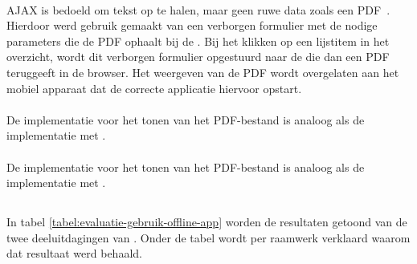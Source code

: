 \paragraph{\kendo}
AJAX is bedoeld om tekst op te halen, maar geen ruwe data zoals een PDF~\cite{Scott2009}. 
Hierdoor werd gebruik gemaakt van een verborgen formulier met de nodige parameters die de PDF ophaalt bij de . 
Bij het klikken op een lijstitem in het overzicht, wordt dit verborgen formulier opgestuurd naar de  die dan een PDF teruggeeft in de browser. 
Het weergeven van de PDF wordt overgelaten aan het mobiel apparaat dat de correcte applicatie hiervoor opstart.

\paragraph{\jqm}
De implementatie voor het tonen van het PDF-bestand is analoog als de implementatie met \kendo{}.

\paragraph{\lungo}
De implementatie voor het tonen van het PDF-bestand is analoog als de implementatie met \kendo{}.


\subsection{}
\label{sec:evaluatie-gebruik-offline-app}

In tabel \ref{tabel:evaluatie-gebruik-offline-app} worden de resultaten getoond van de twee deeluitdagingen van .
Onder de tabel wordt per raamwerk verklaard waarom dat resultaat werd behaald.

\begin{table}[H]
\centering
{}
\caption{Gebruik van  voor \st{}~(\sta), \kendo{}~(\kendoa), \jqm{}~(\jqma) en \lungo{}~(\lungoa).}
\label{tabel:evaluatie-gebruik-offline-app}
\end{table}

